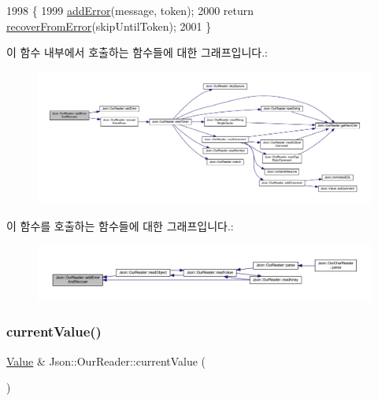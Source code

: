 \begin{DoxyCode}
1998                                                           \{
1999   \hyperlink{class_json_1_1_our_reader_aa6a920311e6408ff3a45324d49da18a6}{addError}(message, token);
2000   \textcolor{keywordflow}{return} \hyperlink{class_json_1_1_our_reader_a035651f0700a76a815e5f904c63ebb1c}{recoverFromError}(skipUntilToken);
2001 \}
\end{DoxyCode}
이 함수 내부에서 호출하는 함수들에 대한 그래프입니다.\+:\nopagebreak
\begin{figure}[H]
\begin{center}
\leavevmode
\includegraphics[width=350pt]{class_json_1_1_our_reader_a074cf3d91e9404fe89e03cfc6a43e6fb_cgraph}
\end{center}
\end{figure}
이 함수를 호출하는 함수들에 대한 그래프입니다.\+:\nopagebreak
\begin{figure}[H]
\begin{center}
\leavevmode
\includegraphics[width=350pt]{class_json_1_1_our_reader_a074cf3d91e9404fe89e03cfc6a43e6fb_icgraph}
\end{center}
\end{figure}
\mbox{\label{class_json_1_1_our_reader_a2acd5b1d53e7d7e17c21ff8e96edc09d}} 
\subsubsection{\texorpdfstring{current\+Value()}{currentValue()}}
{\footnotesize\ttfamily \hyperlink{class_json_1_1_value}{Value} \& Json\+::\+Our\+Reader\+::current\+Value (\begin{DoxyParamCaption}{ }\end{DoxyParamCaption})\hspace{0.3cm}{\ttfamily [private]}}




